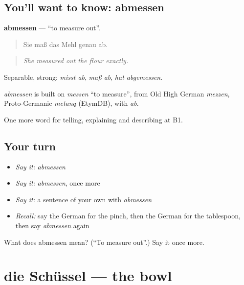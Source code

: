 \subsection*{You'll want to know: abmessen}
\textbf{abmessen} — \textquotedblleft{}to measure out\textquotedblright{}.

\begin{quote}
Sie maß das Mehl genau ab.
\end{quote}

\begin{quote}
\emph{She measured out the flour exactly.}
\end{quote}

Separable, strong: \emph{misst ab}, \emph{maß ab}, \emph{hat abgemessen}.

\begin{cousinweb}
\emph{abmessen} is built on \emph{messen} \textquotedblleft{}to measure\textquotedblright{}, from Old High German \emph{mezzen}, Proto-Germanic \emph{metaną} (EtymDB), with \emph{ab}.
\end{cousinweb}

\begin{grammarlens}[title={What you've built}]
One more word for telling, explaining and describing at B1.
\end{grammarlens}

\subsection*{Your turn}
\begin{itemize}
\raggedright
  \item \emph{Say it:} \emph{abmessen}
  \item \emph{Say it:} \emph{abmessen}, once more
  \item \emph{Say it:} a sentence of your own with \emph{abmessen}
  \item \emph{Recall:} say the German for the pinch, then the German for the tablespoon, then say \emph{abmessen} again
\end{itemize}

\begin{tcolorbox}[breakable,colback=teal!4,colframe=teal!35!black,title={Before you move on}]
What does abmessen mean? (\textquotedblleft{}To measure out\textquotedblright{}.) Say it once more.
\end{tcolorbox}
\section[die Schüssel]{die Schüssel — the bowl}


